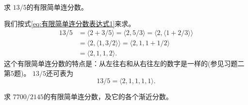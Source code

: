 \begin{example}
	求 \( 13/5 \)的有限简单连分数。
\end{example}
\begin{solution}
	我们按式\eqref{eq:有限简单连分数表达式1}来求。
	\begin{align*}
		13/5 & = \langle 2 + 3/5 \rangle = \langle 2, 5/3 \rangle = \langle 2, \langle 1+2/3 \rangle \rangle \\
		     & = \langle 2, \langle 1, 3/2 \rangle \rangle = \langle 2, 1, 1 + 1/2 \rangle                   \\
		     & = \langle 2, 1, 1, 2 \rangle.
	\end{align*}
	这个有限简单连分数的特点是：从左往右和从右往左的数字是一样的(参见习题二第5题)。 \( 13/5 \)还可表为
	\begin{equation*}
		13/5 = \langle 2, 1, 1, 1, 1 \rangle.
	\end{equation*}
\end{solution}

\begin{example}
	求 \( 7700/2145 \)的有限简单连分数，及它的各个渐近分数。
\end{example}

